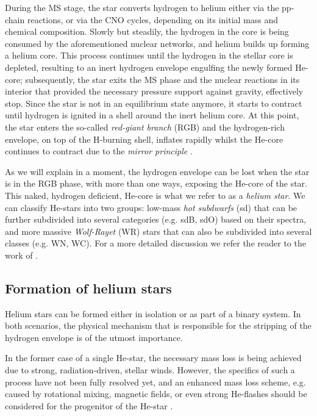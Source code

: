 \documentclass[../../main/thesis_msc.tex]{subfiles}
\begin{document}
    	During the MS stage, the star converts hydrogen to helium either via the pp-chain reactions, or via the CNO cycles, depending on its initial mass and chemical composition. Slowly but steadily, the hydrogen in the core is being consumed by the aforementioned nuclear networks, and helium builds up forming a helium core. This process continues until the hydrogen in the stellar core is depleted, resulting to an inert hydrogen envelope engulfing the newly formed He-core; subsequently, the star exits the MS phase and the nuclear reactions in its interior that provided the necessary pressure support against gravity, effectively stop. Since the star is not in an equilibrium state anymore, it starts to contract until hydrogen is ignited in a shell around the inert helium core. At this point, the star enters the so-called \emph{red-giant branch} (RGB) and the hydrogen-rich envelope, on top of the H-burning shell, inflates rapidly whilst the He-core continues to contract due to the \emph{mirror principle} \citep[see][p.~369]{Kipp_book}.
    	
    	As we will explain in a moment, the hydrogen envelope can be lost when the star is in the RGB phase, with more than one ways, exposing the He-core of the star. This naked, hydrogen deficient, He-core is what we refer to as a \emph{helium star}. We can classify He-stars into two groups: low-mass \emph{hot subdwarfs} (sd) that can be further subdivided into several categories (e.g. sdB, sdO) based on their spectra, and more massive \emph{Wolf-Rayet} (WR) stars that can also be subdivided into several classes (e.g. WN, WC). For a more detailed discussion we refer the reader to the work of \cite{Han2002, Han2003, Heber2009, Chiosi86, langer12}.


			\subsection{Formation of helium stars}
			
				Helium stars can be formed either in isolation or as part of a binary system. In both scenarios, the physical mechanism that is responsible for the stripping of the hydrogen envelope is of the utmost importance.
				
				In the former case of a single He-star, the necessary mass loss is being achieved due to strong, radiation-driven, stellar winds. However, the specifics of such a process have not been fully resolved yet, and an enhanced mass loss scheme, e.g. caused by rotational mixing, magnetic fields, or even strong He-flashes should be considered for the progenitor of the He-star \citep{Sweigart, Heber2009}. 
				
\end{document}
